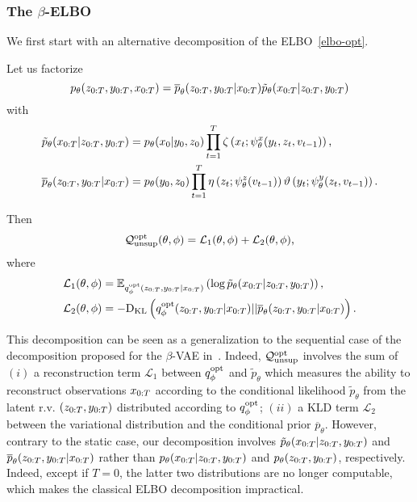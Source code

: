 \subsubsection{The $\beta$-ELBO}
We first start with an alternative decomposition of the ELBO~\eqref{elbo-opt}.

\begin{corollary}
\label{corollary1}
Let us factorize 
$$p_{\theta}(z_{0:T},y_{0:T},x_{0:T})=\overline{p}_{\theta}(z_{0:T},y_{0:T}|x_{0:T})\tilde{p}_{\theta}(x_{0:T}|z_{0:T},y_{0:T})$$
with
\begin{align}
\label{tilde-p}
\tilde{p}_{\theta}(x_{0:T}|z_{0:T},y_{0:T})&=p_{\theta}(x_0|y_{0},z_0)\prod_{t=1}^T \zeta \left(x_t;\psi^{x}_{\theta}(y_t, z_{t},{v}_{t-1})\right) \text{,} \\
\label{barre-p}
\overline{p}_{\theta}(z_{0:T},y_{0:T}|x_{0:T})&=p_{\theta}(y_0,z_0)\prod_{t=1}^T 
\eta\left(z_t; \psi^{z}_{\theta}({v}_{t-1})\right) \vartheta \left(y_t;\psi^{y}_{\theta}(z_{t},{v}_{t-1})\right).
\end{align}

Then 
\begin{equation}
\label{elbo-opt-2}
    \mathcal{Q}_{\mathrm{unsup}}^{\rm opt}(\theta,\phi) = \mathcal{L}_1(\theta,\phi) +  \mathcal{L}_2(\theta,\phi) \text{,}
\end{equation}    
where 
\begin{align}
\label{L-1}
\mathcal{L}_1(\theta,\phi) &={{\mathbb{E}}}_{q_\phi^{\rm opt}(z_{0:T},y_{0:T}|x_{0:T})}\left( \log \tilde{p}_{\theta}(x_{0:T}|z_{0:T},y_{0:T})\right)\text{,} \\
\label{L-2}
 \mathcal{L}_2(\theta,\phi) &= - \mathrm{D}_{\mathrm{KL}} \left(q_\phi^{\rm opt}(z_{0:T},y_{0:T}|x_{0:T})|| \overline{p}_{\theta}(z_{0:T},y_{0:T}|x_{0:T})\right)  \text{.}
\end{align}
\end{corollary}

This decomposition can be seen as
a generalization to the sequential case of the decomposition proposed
for the $\beta$-VAE in~\citep{higgins2017beta}. Indeed, $\mathcal{Q}_{\mathrm{unsup}}^{\rm opt}$ involves
the sum of $(i)$ a reconstruction term $\mathcal{L}_1$ between 
$q_\phi^{\rm opt}$ and $\tilde{p}_{\theta}$ 
which measures the ability 
to reconstruct observations $x_{0:T}$
according to the conditional likelihood
$\tilde{p}_{\theta}$
from the latent r.v. $(z_{0:T},y_{0:T})$ 
distributed according to $q_\phi^{\rm opt}$;
$(ii)$ a KLD term $\mathcal{L}_2$
between the variational distribution and the conditional
prior $\overline{p}_{\theta}$.
However, contrary to the static
case, our decomposition involves 
$\tilde{p}_{\theta}(x_{0:T}|z_{0:T},y_{0:T})$ 
and $\overline{p}_{\theta}(z_{0:T},y_{0:T}|x_{0:T})$
rather than $p_{\theta}(x_{0:T}|z_{0:T},y_{0:T})$  
and $p_{\theta}(z_{0:T},y_{0:T})$, respectively. 
Indeed, except if $T=0$, the latter two distributions are no longer computable, 
which makes the classical ELBO decomposition impractical.

